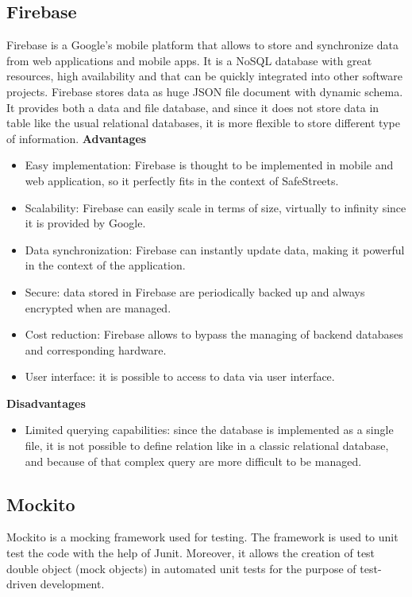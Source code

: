 \documentclass[../ITD.tex]{subfiles}
\begin{document}
    \subsection{Firebase}\label{subsec:firebase}
    Firebase is a Google's mobile platform that allows to store and synchronize data from web applications and mobile apps.
    It is a NoSQL database with great resources, high availability and that can be quickly integrated into other software projects.
    Firebase stores data as huge JSON file document with dynamic schema.
    It provides both a data and file database, and since it does not store data in table like the usual relational databases, it is more flexible to store different type of information.
    \newline
    \textbf{Advantages}
    \begin{itemize}
        \item Easy implementation: Firebase is thought to be implemented in mobile and web application, so it perfectly fits in the context of SafeStreets.
        \item Scalability: Firebase can easily scale in terms of size, virtually to infinity since it is provided by Google.
        \item Data synchronization: Firebase can instantly update data, making it powerful in the context of the application.
        \item Secure: data stored in Firebase are periodically backed up and always encrypted when are managed.
        \item Cost reduction: Firebase allows to bypass the managing of backend databases and corresponding hardware.
        \item User interface: it is possible to access to data via user interface.
    \end{itemize}
    \textbf{Disadvantages}
    \begin{itemize}
        \item Limited querying capabilities: since the database is implemented as a single file, it is not possible to define relation like in a classic relational database, and because of that complex query are more difficult to be managed.
    \end{itemize}

    \subsection{Mockito}\label{subsec:mokito}
    Mockito is a mocking framework used for testing.
    The framework is used to unit test the code with the help of Junit.
    Moreover, it allows the creation of test double object (mock objects) in automated unit tests for the purpose of test-driven development.
\end{document}
